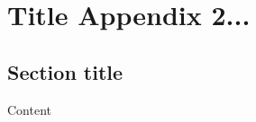 \documentclass[../main/thesis.tex]{subfiles}
\begin{document}
\chapter{Title Appendix 2...}

\section{Section title}
Content

\bib
\end{document}

